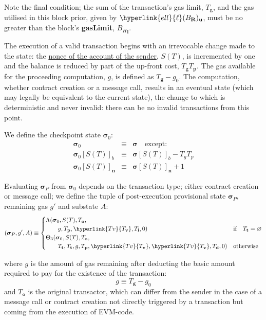 \documentclass[9pt,oneside]{amsart}
\begin{document}
\begin{multicols}{2}
Note the final condition; the sum of the transaction's gas limit, $T_\mathbf{g}$, and the gas utilised in this block prior, given by $ \hyperlink{ell}{\ell}(B_\mathbf{R})_\mathbf{u}$, must be no greater than the block's \textbf{gasLimit}, ${B_H}_\mathbf{l}$.

The execution of a valid transaction begins with an irrevocable change made to the state: the \hyperlink{account nonce}{nonce of the account of the sender}, $S(T)$, is incremented by one and the balance is reduced by part of the up-front cost, $T_\mathbf{g}T_\mathbf{p}$. The gas available for the proceeding computation, $g$, is defined as $T_\mathbf{g} - g_0$. The computation, whether contract creation or a message call, results in an eventual state (which may legally be equivalent to the current state), the change to which is deterministic and never invalid: there can be no invalid transactions from this point.

We define the checkpoint state $\boldsymbol{\sigma}_0$:
\begin{eqnarray}
\boldsymbol{\sigma}_0 & \equiv & \boldsymbol{\sigma} \quad \text{except:} \\
\boldsymbol{\sigma}_0[S(T)]_b & \equiv & \boldsymbol{\sigma}[S(T)]_b - T_g T_p \\%
\boldsymbol{\sigma}_0[S(T)]_\mathbf{n} & \equiv & \boldsymbol{\sigma}[S(T)]_\mathbf{n} + 1
\end{eqnarray}

Evaluating $\boldsymbol{\sigma}_P$ from $\boldsymbol{\sigma}_0$ depends on the transaction type; either contract creation or message call; we define the tuple of post-execution provisional state $\boldsymbol{\sigma}_P$, remaining gas $g'$ and substate $A$:
\begin{equation}
(\boldsymbol{\sigma}_P, g', A) \equiv \begin{cases}
\Lambda(\boldsymbol{\sigma}_0, S(T), T_\mathbf{o}, &\\ \quad\quad g, T_\mathbf{p}, \hyperlink{T v}{T_\mathbf{v}}, T_\mathbf{i}, 0) & \text{if} \quad T_\mathbf{t} = \varnothing \\
\Theta_{3}(\boldsymbol{\sigma}_0, S(T), T_\mathbf{o}, &\\ \quad\quad T_\mathbf{t}, T_\mathbf{t}, g, T_\mathbf{p}, \hyperlink{T v}{T_\mathbf{v}}, \hyperlink{T v}{T_\mathbf{v}}, T_\mathbf{d}, 0) & \text{otherwise}
\end{cases}
\end{equation}

where $g$ is the amount of gas remaining after deducting the basic amount required to pay for the existence of the transaction:
\begin{equation}
g \equiv T_\mathbf{g} - g_0
\end{equation}
and $T_\mathbf{o}$ is the original transactor, which can differ from the sender in the case of a message call or contract creation not directly triggered by a transaction but coming from the execution of EVM-code.


\end{multicols}
\end{document}
